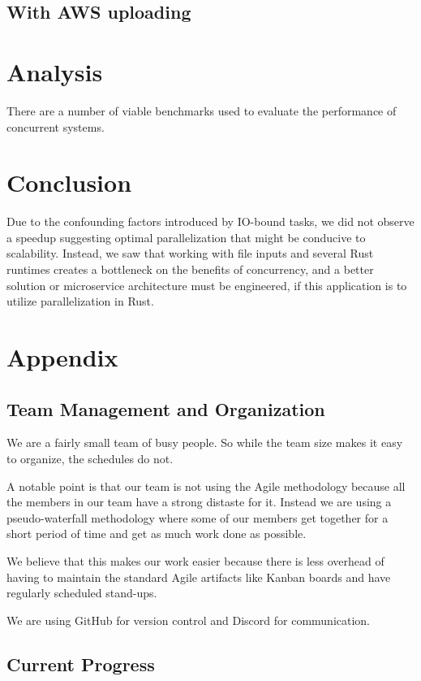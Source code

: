 \documentclass[conference]{IEEEtran}
\begin{document}
\subsection{With AWS uploading}

\section{Analysis}
There are a number of viable benchmarks used to evaluate the performance of concurrent systems.

\section{Conclusion}
Due to the confounding factors introduced by IO-bound tasks, we did not observe a speedup suggesting optimal 
parallelization that might be conducive to scalability. Instead, we saw that working with file inputs and 
several Rust runtimes creates a bottleneck on the benefits of concurrency, and a better solution or microservice
architecture must be engineered, if this application is to utilize parallelization in Rust.

\section{Appendix}
\subsection{Team Management and Organization}
We are a fairly small team of busy people.
So while the team size makes it easy to organize, the schedules do not.

A notable point is that our team is not using the Agile methodology because
all the members in our team have a strong distaste for it.
Instead we are using a pseudo-waterfall methodology where some of our members get together
for a short period of time and get as much work done as possible.

We believe that this makes our work easier because there is less overhead of having
to maintain the standard Agile artifacts like Kanban boards and have regularly scheduled stand-ups.

We are using GitHub for version control and Discord for communication.

\subsection{Current Progress}
\end{document}
